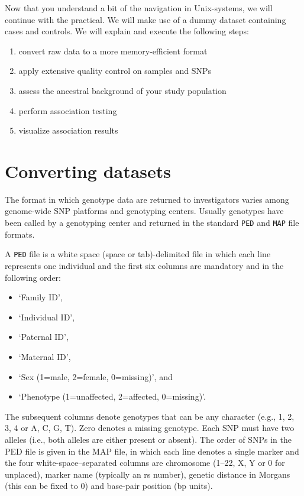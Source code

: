 \documentclass[
]{book}
\newcommand{\passthrough}[1]{#1}
\providecommand{\tightlist}{%
  \setlength{\itemsep}{0pt}\setlength{\parskip}{0pt}}
\begin{document}
Now that you understand a bit of the navigation in Unix-systems, we will continue with the practical. We will make use of a dummy dataset containing cases and controls. We will explain and execute the following steps:

\begin{enumerate}
\def\labelenumi{\arabic{enumi}.}
\tightlist
\item
  convert raw data to a more memory-efficient format
\item
  apply extensive quality control on samples and SNPs
\item
  assess the ancestral background of your study population
\item
  perform association testing
\item
  visualize association results
\end{enumerate}

\hypertarget{converting-datasets}{%
\section{Converting datasets}\label{converting-datasets}}

The format in which genotype data are returned to investigators varies among genome-wide SNP platforms and genotyping centers. Usually genotypes have been called by a genotyping center and returned in the standard \passthrough{\lstinline!PED!} and \passthrough{\lstinline!MAP!} file formats.

A \passthrough{\lstinline!PED!} file is a white space (space or tab)-delimited file in which each line represents one individual and the first six columns are mandatory and in the following order:

\begin{itemize}
\tightlist
\item
  `Family ID',
\item
  `Individual ID',
\item
  `Paternal ID',
\item
  `Maternal ID',
\item
  `Sex (1=male, 2=female, 0=missing)', and
\item
  `Phenotype (1=unaffected, 2=affected, 0=missing)'.
\end{itemize}

The subsequent columns denote genotypes that can be any character (e.g., 1, 2, 3, 4 or A, C, G, T). Zero denotes a missing genotype. Each SNP must have two alleles (i.e., both alleles are either present or absent).
The order of SNPs in the PED file is given in the MAP file, in which each line denotes a single marker and the four white-space--separated columns are chromosome (1--22, X, Y or 0 for unplaced), marker name (typically an rs number), genetic distance in Morgans (this can be fixed to 0) and base-pair position (bp units).
\end{document}
